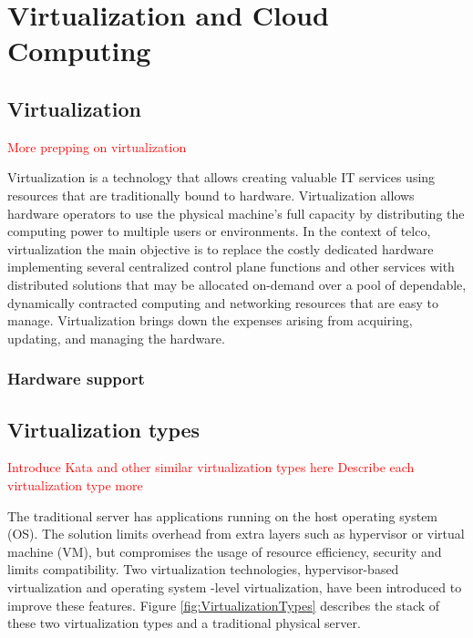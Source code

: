 \chapter{Virtualization and Cloud Computing}
\label{chapter:cloudcomputing}




\section{Virtualization}
\textcolor{red}{More prepping on virtualization}

Virtualization is a technology that allows creating valuable IT services using resources that are traditionally bound to hardware. Virtualization allows hardware operators to use the physical machine's full capacity by distributing the computing power to multiple users or environments. \cite{RedHat} In the context of telco, virtualization the main objective is to replace the costly dedicated hardware implementing several centralized control plane functions and other services with distributed solutions that may be allocated on-demand over a pool of dependable, dynamically contracted computing and networking resources that are easy to manage. \cite{Bosch2011} Virtualization brings down the expenses arising from acquiring, updating, and managing the hardware.

\subsection{Hardware support}

\section{Virtualization types}
\textcolor{red}{Introduce Kata and other similar virtualization types here}
\textcolor{red}{Describe each virtualization type more}

The traditional server has applications running on the host operating system (OS). The solution limits overhead from extra layers such as hypervisor or virtual machine (VM), but compromises the usage of resource efficiency, security and limits compatibility. Two virtualization technologies, hypervisor-based virtualization and operating system -level virtualization, have been introduced to improve these features. Figure \ref{fig:VirtualizationTypes} describes the stack of these two virtualization types and a traditional physical server.


